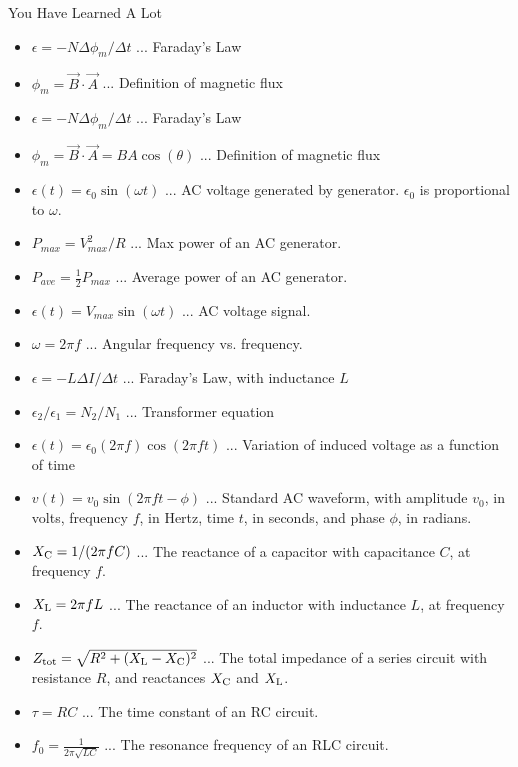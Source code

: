 \documentclass{beamer}
\begin{document}
\begin{frame}{You Have Learned A Lot}
\scriptsize
\begin{itemize}
\item $\epsilon = -N \Delta \phi_m /\Delta t$ ... Faraday's Law
\item $\phi_m = \vec{B} \cdot \vec{A}$ ... Definition of magnetic flux
\item $\epsilon = -N \Delta \phi_m /\Delta t$ ... Faraday's Law
\item $\phi_m = \vec{B} \cdot \vec{A} = BA \cos(\theta)$ ... Definition of magnetic flux
\item $\epsilon(t) = \epsilon_0 \sin(\omega t)$ ... AC voltage generated by generator.  $\epsilon_0$ is proportional to $\omega$.
\item $P_{max} = V_{max}^2/R$ ... Max power of an AC generator.
\item $P_{ave} = \frac{1}{2} P_{max}$ ... Average power of an AC generator.
\item $\epsilon(t) = V_{max} \sin(\omega t)$ ... AC voltage signal.
\item $\omega = 2\pi f$ ... Angular frequency vs. frequency.
\item $\epsilon = -L \Delta I/\Delta t$ ... Faraday's Law, with inductance $L$
\item $\epsilon_2/\epsilon_1 = N_2/N_1$ ... Transformer equation
\item $\epsilon(t) = \epsilon_0 (2 \pi f) \cos(2\pi ft)$ ... Variation of induced voltage as a function of time
\item $v(t) = v_0 \sin(2\pi ft - \phi)$ ... Standard AC waveform, with amplitude $v_0$, in volts, frequency $f$, in Hertz, time $t$, in seconds, and phase $\phi$, in radians.
\item $X_{\rm C} = 1/(2\pi f C)$ ... The reactance of a capacitor with capacitance $C$, at frequency $f$.
\item $X_{\rm L} = 2\pi f L$ ... The reactance of an inductor with inductance $L$, at frequency $f$.
\item $Z_{\rm tot} = \sqrt{R^2 + (X_{\rm L} - X_{\rm C})^2}$ ... The total impedance of a series circuit with resistance $R$, and reactances $X_{\rm C}$ and $X_{\rm L}$.
\item $\tau = RC$ ... The time constant of an RC circuit.
\item $f_0 = \frac{1}{2\pi\sqrt{LC}}$ ... The resonance frequency of an RLC circuit.
\end{itemize}
\end{frame}
\end{document}
